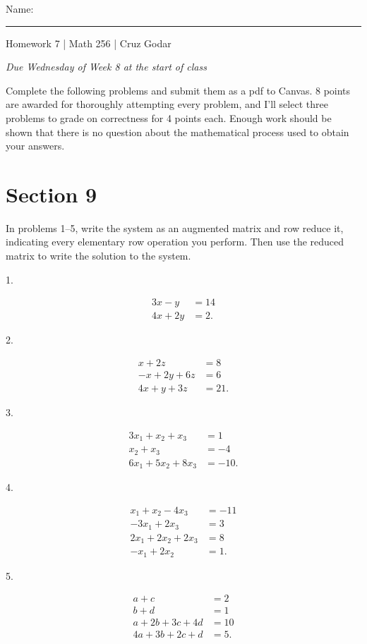 \documentclass{article}
\begin{document}
\Large Name: \rule{2in}{0.15mm} \hfill Homework 7 | Math 256 | Cruz Godar \vspace{4pt}  \normalsize

\textit{Due Wednesday of Week 8 at the start of class}

Complete the following problems and submit them as a pdf to Canvas. 8 points are awarded for thoroughly attempting every problem, and I'll select three problems to grade on correctness for 4 points each. Enough work should be shown that there is no question about the mathematical process used to obtain your answers.

\section{Section 9}

In problems 1--5, write the system as an augmented matrix and row reduce it, indicating every elementary row operation you perform. Then use the reduced matrix to write the solution to the system.

1.

\begin{align*}
	3x - y &= 14\\
	4x + 2y &= 2.
\end{align*}

2.

\begin{align*}
	x + 2z &= 8\\
	-x + 2y + 6z &= 6\\
	4x + y + 3z &= 21.
\end{align*}

3.

\begin{align*}
	3x_1 + x_2 + x_3 &= 1\\
	x_2 + x_3 &= -4\\
	6x_1 + 5x_2 + 8x_3 &= -10.
\end{align*}

4.

\begin{align*}
	x_1 + x_2 - 4x_3 &= -11\\
	-3x_1 + 2x_3 &= 3\\
	2x_1 + 2x_2 + 2x_3 &= 8\\
	-x_1 + 2x_2 &= 1.
\end{align*}

5.

\begin{align*}
	a + c &= 2\\
	b + d &= 1\\
	a + 2b + 3c + 4d &= 10\\
	4a + 3b + 2c + d &= 5.
\end{align*}
\end{document}
